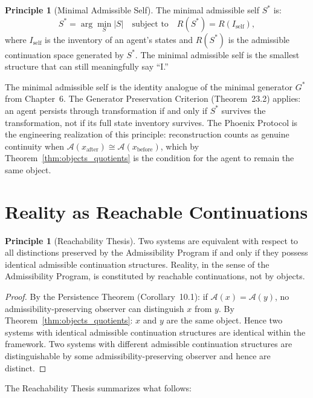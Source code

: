 \documentclass[12pt, oneside]{book}
\theoremstyle{flyxion}
\theoremstyle{definition}
\newtheorem{principle}[theorem]{Principle}
\begin{document}
\begin{principle}[Minimal Admissible Self]
\label{prin:minimal_self}
The minimal admissible self $S^*$ is:
\[
S^* = \arg\min_S |S| \quad \text{subject to} \quad
R(S^*) = R(I_\mathrm{self}),
\]
where $I_\mathrm{self}$ is the inventory of an agent's
states and $R(S^*)$ is the admissible continuation
space generated by $S^*$. The minimal admissible self
is the smallest structure that can still meaningfully
say ``I.''
\end{principle}

The minimal admissible self is the identity analogue
of the minimal generator $G^*$ from Chapter~6. The
Generator Preservation Criterion (Theorem~23.2)
applies: an agent persists through transformation if
and only if $S^*$ survives the transformation, not
if its full state inventory survives. The Phoenix
Protocol is the engineering realization of this
principle: reconstruction counts as genuine continuity
when $\mathcal{A}(x_\mathrm{after}) \cong
\mathcal{A}(x_\mathrm{before})$, which by
Theorem~\ref{thm:objects_quotients} is the condition
for the agent to remain the same object.

\section{Reality as Reachable Continuations}

\begin{principle}[Reachability Thesis]
\label{prin:reachability_thesis}
Two systems are equivalent with respect to all
distinctions preserved by the Admissibility Program
if and only if they possess identical admissible
continuation structures. Reality, in the sense of
the Admissibility Program, is constituted by
reachable continuations, not by objects.
\end{principle}

\begin{proof}
By the Persistence Theorem (Corollary~10.1): if
$\mathcal{A}(x) = \mathcal{A}(y)$, no
admissibility-preserving observer can distinguish
$x$ from $y$. By Theorem~\ref{thm:objects_quotients}:
$x$ and $y$ are the same object. Hence two systems
with identical admissible continuation structures are
identical within the framework. Two systems with
different admissible continuation structures are
distinguishable by some admissibility-preserving
observer and hence are distinct.
\end{proof}

The Reachability Thesis summarizes what follows:
\end{document}
